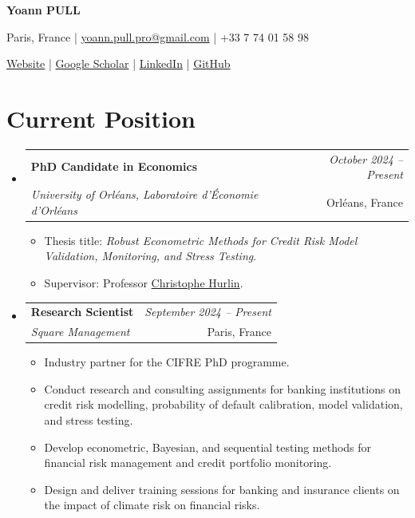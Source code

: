 \documentclass[a4paper,11pt]{article}
\makeatletter
\newcommand{\resumeSubheading}[4]{
\vspace{0.5mm}\item
    \begin{tabular*}{0.98\textwidth}[t]{l@{\extracolsep{\fill}}r}
        \textbf{#1} & \textit{\footnotesize{#4}} \\
        \textit{\footnotesize{#3}} &  \footnotesize{#2}\\
    \end{tabular*}
    \vspace{-2.4mm}
}
\newcommand{\resumeSubHeadingListStart}{\begin{itemize}[leftmargin=*,labelsep=1mm]}
\newcommand{\resumeItemListStart}{\begin{itemize}[leftmargin=*,labelsep=1mm,itemsep=0.5mm]\small}
\newcommand{\resumeSubHeadingListEnd}{\end{itemize}\vspace{2mm}}
\newcommand{\resumeItemListEnd}{\end{itemize}\vspace{-2mm}}
\newcommand{\headerfontiii}{\fontfamily{ppl}\selectfont}
\makeatother
\begin{document}
\headerfontiii
\begin{center}
    {\Huge\textbf{Yoann PULL}}
\end{center}
\vspace{-6mm}
\begin{center}
    \small{
    Paris, France \;|\;
    \href{mailto:yoann.pull.pro@gmail.com}{yoann.pull.pro@gmail.com} \;|\;
    +33 7 74 01 58 98
    }
\end{center}
\vspace{-6mm}
\begin{center}
    \small{
    \href{https://yoannpull.github.io/mywebsite/}{Website} \;|\;
    \href{https://scholar.google.com/citations?user=lmJQgZsAAAAJ\&hl=en\&oi=ao}{Google Scholar} \;|\;
    \href{https://www.linkedin.com/in/yoann-pull/}{LinkedIn} \;|\;
    \href{https://github.com/YoannPull}{GitHub}
    }
\end{center}
\vspace{-4mm}
\section{\textbf{Current Position}}
\vspace{-0.4mm}
\resumeSubHeadingListStart
\resumeSubheading
{PhD Candidate in Economics}{Orléans, France}
{University of Orléans, Laboratoire d'Économie d'Orléans}{October 2024 -- Present}
\resumeItemListStart
\item Thesis title: \textit{Robust Econometric Methods for Credit Risk Model Validation, Monitoring, and Stress Testing}.
\item Supervisor: Professor \href{https://sites.google.com/view/christophe-hurlin/home}{Christophe Hurlin}.
\resumeItemListEnd
\resumeSubheading
{Research Scientist}{Paris, France}
{Square Management}{September 2024 -- Present}
\resumeItemListStart
\item Industry partner for the CIFRE PhD programme.
\item Conduct research and consulting assignments for banking institutions on credit risk modelling, probability of default calibration, model validation, and stress testing.
\item Develop econometric, Bayesian, and sequential testing methods for financial risk management and credit portfolio monitoring.
\item Design and deliver training sessions for banking and insurance clients on the impact of climate risk on financial risks.
\resumeItemListEnd
\resumeSubHeadingListEnd
\vspace{-6mm}
\end{document}

